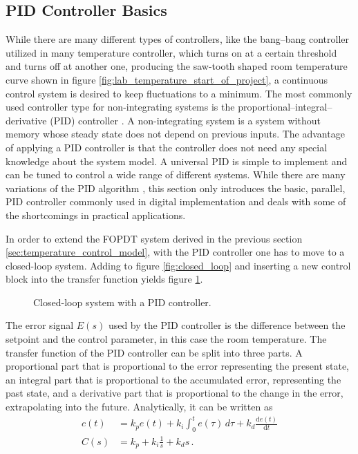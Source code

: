 \subsection{PID Controller Basics}%
\label{sec:pid_controller_basics}
While there are many different types of controllers, like the bang–bang controller utilized in many temperature controller, which turns on at a certain threshold and turns off at another one, producing the saw-tooth shaped room temperature curve shown in figure \ref{fig:lab_temperature_start_of_project}, a continuous control system is desired to keep fluctuations to a minimum. The most commonly used controller type for non-integrating systems is the proportional–integral–derivative (PID) controller \cite{pid_in_industry}. A non-integrating system is a system without memory whose steady state does not depend on previous inputs. The advantage of applying a PID controller is that the controller does not need any special knowledge about the system model. A universal PID is simple to implement and can be tuned to control a wide range of different systems. While there are many variations of the PID algorithm \cite{pid_controller}, this section only introduces the basic, parallel, PID controller commonly used in digital implementation and deals with some of the shortcomings in practical applications.

In order to extend the FOPDT system derived in the previous section \ref{sec:temperature_control_model}, with the PID controller one has to move to a closed-loop system. Adding to figure \ref{fig:closed_loop} and inserting a new control block into the transfer function yields figure \ref{fig:closed_loop_pid}.
\begin{figure}[ht]
    \centering
    \caption{Closed-loop system with a PID controller.}
    \label{fig:closed_loop_pid}
\end{figure}

The error signal $E(s)$ used by the PID controller is the difference between the setpoint and the control parameter, in this case the room temperature. The transfer function of the PID controller can be split into three parts. A proportional part that is proportional to the error representing the present state, an integral part that is proportional to the accumulated error, representing the past state, and a derivative part that is proportional to the change in the error, extrapolating into the future. Analytically, it can be written as
\begin{align}
    c(t) &= k_p e(t) + k_i \int_0^t e(\tau) \,d\tau + k_d \frac{\mathrm{d}e(t)}{\mathrm{d}t} \label{eqn:pid_controller}\\
    C(s) &= k_p + k_i \frac{1}{s} + k_d s \,. \label{eqn:pid_controller_laplace}
\end{align}

